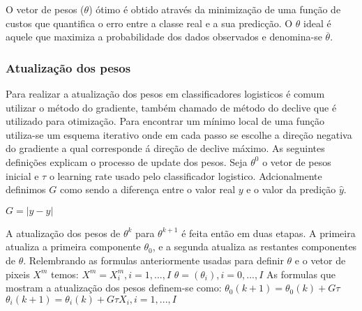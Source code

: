 \hfill\newline
\hfill\newline

O vetor de pesos ($\theta$) ótimo é obtido através da minimização de uma função de custos que quantifica o erro entre a classe real e a sua predicção. O $\theta$ ideal é aquele que maximiza a probabilidade dos dados observados e denomina-se $\overline{\theta}$. \newline

\subsubsection{Atualização dos pesos}\hfill\newline
\hfill\newline

Para realizar a atualização dos pesos em classificadores logisticos é comum utilizar o método do gradiente, também chamado de método do declive que é utilizado para otimização. Para encontrar um mínimo local de uma função utiliza-se um esquema iterativo onde em cada passo se escolhe a direção negativa do gradiente a qual corresponde á direção de declive máximo. As seguintes definições explicam o processo de update dos pesos.\newline
\hfill\newline
Seja $\theta^0$ o vetor de pesos inicial e $\tau$ o learning rate usado pelo classificador logistico. Adcionalmente definimos $G$ como sendo a diferença entre o valor real $y$ e o valor da predição $\hat{y}$.\hfill\newline
\hfill\newline

$G = |y - \hat{y}|$ 
\hfill\newline
\hfill\newline

 A atualização dos pesos de $\theta^k$ para $\theta^{k+1}$ é feita então em duas etapas. A primeira atualiza a primeira componente $\theta_0$, e a segunda atualiza as restantes componentes de $\theta$\cite{ref2,ref4}.\hfill\newline
Relembrando as formulas anteriormente usadas para definir $\theta$ e o vetor de pixeis $X^m$ temos:\hfill\newline
\hfill\newline
$X^m=X_i^m, i=1,...,I$\hfill\newline
\hfill\newline
$\theta = (\theta_i),i=0,...,I$\hfill\newline
\hfill\newline
As formulas que mostram a atualização dos pesos definem-se como:\hfill\newline
\hfill\newline
$\theta_0(k+1) = \theta_0(k) + G \tau$\hfill\newline
\hfill\newline
$\theta_i(k+1) = \theta_i(k) + G \tau X_i,i=1,...,I$

